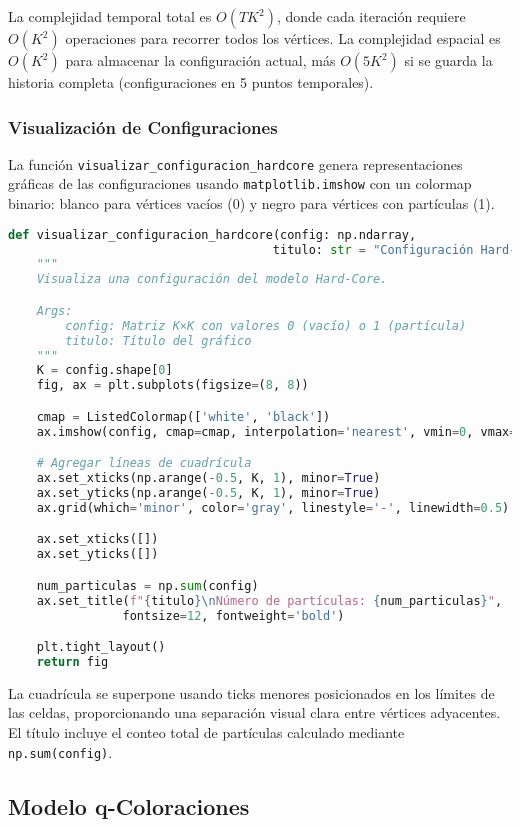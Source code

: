 La complejidad temporal total es $O(TK^2)$, donde cada iteración requiere $O(K^2)$ operaciones para recorrer todos los vértices. La complejidad espacial es $O(K^2)$ para almacenar la configuración actual, más $O(5K^2)$ si se guarda la historia completa (configuraciones en 5 puntos temporales).

\subsubsection{Visualización de Configuraciones}

La función \texttt{visualizar\_configuracion\_hardcore} genera representaciones gráficas de las configuraciones usando \texttt{matplotlib.imshow} con un colormap binario: blanco para vértices vacíos (0) y negro para vértices con partículas (1).

\begin{lstlisting}[language=Python]
def visualizar_configuracion_hardcore(config: np.ndarray,
                                     titulo: str = "Configuración Hard-Core"):
    """
    Visualiza una configuración del modelo Hard-Core.

    Args:
        config: Matriz K×K con valores 0 (vacío) o 1 (partícula)
        titulo: Título del gráfico
    """
    K = config.shape[0]
    fig, ax = plt.subplots(figsize=(8, 8))

    cmap = ListedColormap(['white', 'black'])
    ax.imshow(config, cmap=cmap, interpolation='nearest', vmin=0, vmax=1)

    # Agregar líneas de cuadrícula
    ax.set_xticks(np.arange(-0.5, K, 1), minor=True)
    ax.set_yticks(np.arange(-0.5, K, 1), minor=True)
    ax.grid(which='minor', color='gray', linestyle='-', linewidth=0.5)

    ax.set_xticks([])
    ax.set_yticks([])

    num_particulas = np.sum(config)
    ax.set_title(f"{titulo}\nNúmero de partículas: {num_particulas}",
                fontsize=12, fontweight='bold')

    plt.tight_layout()
    return fig
\end{lstlisting}

La cuadrícula se superpone usando ticks menores posicionados en los límites de las celdas, proporcionando una separación visual clara entre vértices adyacentes. El título incluye el conteo total de partículas calculado mediante \texttt{np.sum(config)}.

\subsection{Modelo q-Coloraciones}


